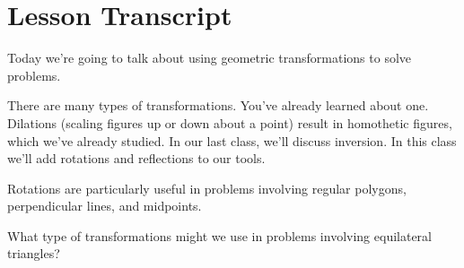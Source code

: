 \section{Lesson Transcript}










Today we're going to talk about using geometric transformations to solve problems.

There are many types of transformations.  You've already learned about one.  Dilations (scaling figures up or down about a point) result in homothetic figures, which we've already studied.  In our last class, we'll discuss inversion.  In this class we'll add rotations and reflections to our tools.

Rotations are particularly useful in problems involving regular polygons, perpendicular lines, and midpoints.

What type of transformations might we use in problems involving equilateral triangles?






